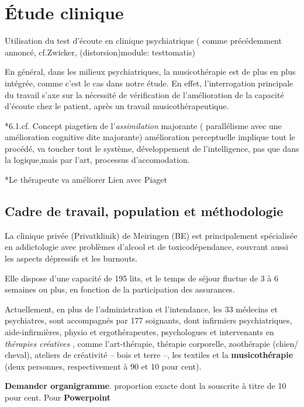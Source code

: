\chapter[\'Etude en clinique]{\'Etude clinique}
Utilisation du test
  d'écoute en clinique psychiatrique
( comme précédemment annoncé, cf.Zwicker, (distorsion)module:
testtomatis)



En général, dans les milieux psychiatriques, la musicothérapie est de plus en plus
intégrée, comme c'est le cas dans notre étude.
En effet, l'interrogation principale du travail s'axe sur la nécessité
de
vérification de l'amélioration de
la capacité d'écoute chez le
patient, après un travail musicothérapeutique.



*6.1.cf. Concept piagetien de l'\textit{assimilation} majorante (
parallélisme avec une amélioration cognitive dite majorante)
amélioration perceptuelle implique tout le procédé, va toucher tout le
système, développement de l'intelligence, pas que dans la logique,mais
par l'art, 
processus d'accomodation.


*Le thérapeute va améliorer
Lien avec Piaget

\section{Cadre de travail, population et méthodologie}

 La clinique privée (Privatklinik)
de Meiringen (BE) est  principalement spécialisée en
addictologie avec problèmes d'alcool et de toxicodépendance, couvrant aussi les aspects dépressifs
et les
burnouts.


Elle dispose d'une capacité de
195 lits, et le temps de séjour fluctue de 3 à 6 semaines ou plus, en
fonction de la participation des assurances.

Actuellement, en plus de l'administration et l'intendance, les 33
médecins et psychiatres, sont
accompagnés par 177
soignants, dont infirmiers psychiatriques, aide-infirmières, physio et
ergothérapeutes, 
psychologues et intervenants en \textit{thérapies
créatives }, comme l'art-thérapie, thérapie
corporelle, zoothérapie (chien/ cheval),  ateliers de créativité --
bois et terre --,  les textiles et la\textbf{ musicothérapie} (deux
personnes, respectivement à 90 et 10 pour cent).


\textbf{Demander organigramme}. proportion exacte
dont la souscrite à titre de 10 pour cent.
Pour\textbf{ Powerpoint}


